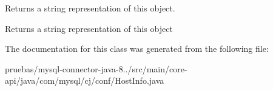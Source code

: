 Returns a string representation of this object.

\begin{DoxyReturn}{Returns}
a string representation of this object 
\end{DoxyReturn}


The documentation for this class was generated from the following file\+:\begin{DoxyCompactItemize}
\item 
pruebas/mysql-\/connector-\/java-\/8../src/main/core-\/api/java/com/mysql/cj/conf/Host\+Info.\+java\end{DoxyCompactItemize}
